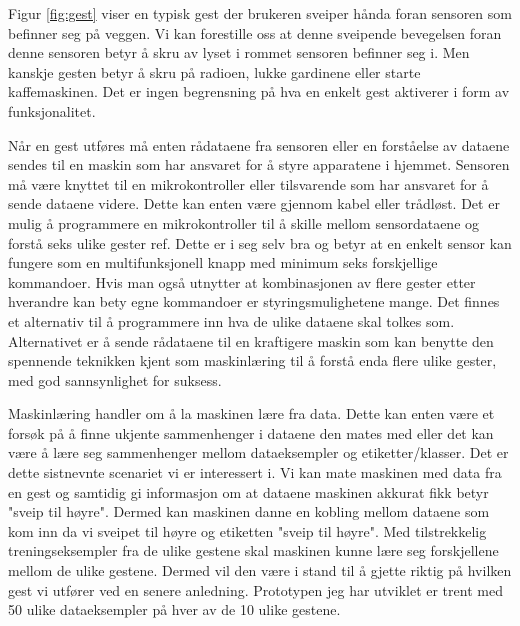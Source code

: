 Figur \ref{fig:gest} viser en typisk gest der brukeren sveiper hånda foran sensoren som befinner seg på veggen. Vi kan forestille oss at denne sveipende bevegelsen foran denne sensoren betyr å skru av lyset i rommet sensoren befinner seg i. Men kanskje gesten betyr å skru på radioen, lukke gardinene eller starte kaffemaskinen. Det er ingen begrensning på hva en enkelt gest aktiverer i form av funksjonalitet.

Når en gest utføres må enten rådataene fra sensoren eller en forståelse av dataene sendes til en maskin som har ansvaret for å styre apparatene i hjemmet. Sensoren må være knyttet til en mikrokontroller eller tilsvarende som har ansvaret for å sende dataene videre. Dette kan enten være gjennom kabel eller trådløst. Det er mulig å programmere en mikrokontroller til å skille mellom sensordataene og forstå seks ulike gester {\color{red} ref}. Dette er i seg selv bra og betyr at en enkelt sensor kan fungere som en multifunksjonell knapp med minimum seks forskjellige kommandoer. Hvis man også utnytter at kombinasjonen av flere gester etter hverandre kan bety egne kommandoer er styringsmulighetene mange. Det finnes et alternativ til å programmere inn hva de ulike dataene skal tolkes som. Alternativet er å sende rådataene til en kraftigere maskin som kan benytte den spennende teknikken kjent som maskinlæring til å forstå enda flere ulike gester, med god sannsynlighet for suksess.

Maskinlæring handler om å la maskinen lære fra data. Dette kan enten være et forsøk på å finne ukjente sammenhenger i dataene den mates med eller det kan være å lære seg sammenhenger mellom dataeksempler og etiketter/klasser. Det er dette sistnevnte scenariet vi er interessert i. Vi kan mate maskinen med data fra en gest og samtidig gi informasjon om at dataene maskinen akkurat fikk betyr "sveip til høyre". Dermed kan maskinen danne en kobling mellom dataene som kom inn da vi sveipet til høyre og etiketten "sveip til høyre". Med tilstrekkelig treningseksempler fra de ulike gestene skal maskinen kunne lære seg forskjellene mellom de ulike gestene. Dermed vil den være i stand til å gjette riktig på hvilken gest vi utfører ved en senere anledning. Prototypen jeg har utviklet er trent med 50 ulike dataeksempler på hver av de 10 ulike gestene.

